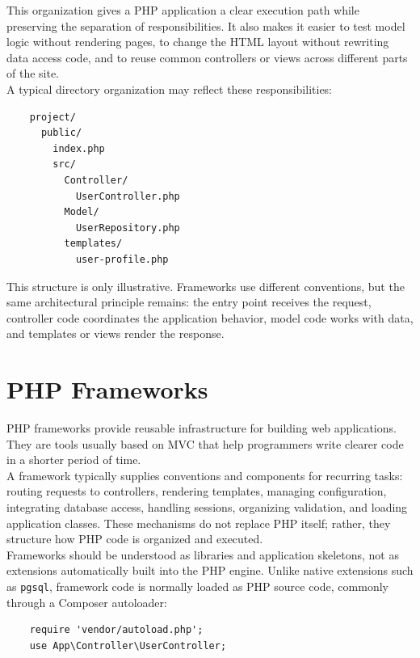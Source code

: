 \documentclass{scrbook}
\begin{document}
	This organization gives a PHP application a clear execution path while preserving the separation of responsibilities. It also makes it easier to test model logic without rendering pages, to change the HTML layout without rewriting data access code, and to reuse common controllers or views across different parts of the site.\\
	
	A typical directory organization may reflect these responsibilities:
	
	\begin{lstlisting}
	project/
	  public/
		index.php
		src/
		  Controller/
			UserController.php
		  Model/
			UserRepository.php
		  templates/
			user-profile.php
	\end{lstlisting}
	
	This structure is only illustrative. Frameworks use different conventions, but the same architectural principle remains: the entry point receives the request, controller code coordinates the application behavior, model code works with data, and templates or views render the response.
	
	\section{PHP Frameworks}
	
	PHP frameworks provide reusable infrastructure for building web applications. They are tools usually based on MVC that help programmers write clearer code in a shorter period of time.\\
	
	A framework typically supplies conventions and components for recurring tasks: routing requests to controllers, rendering templates, managing configuration, integrating database access, handling sessions, organizing validation, and loading application classes. These mechanisms do not replace PHP itself; rather, they structure how PHP code is organized and executed.\\
	
	Frameworks should be understood as libraries and application skeletons, not as extensions automatically built into the PHP engine. Unlike native extensions such as \texttt{pgsql}, framework code is normally loaded as PHP source code, commonly through a Composer autoloader:
	
	\begin{lstlisting}
	require 'vendor/autoload.php';
	use App\Controller\UserController;
	\end{lstlisting}
	
\end{document}
